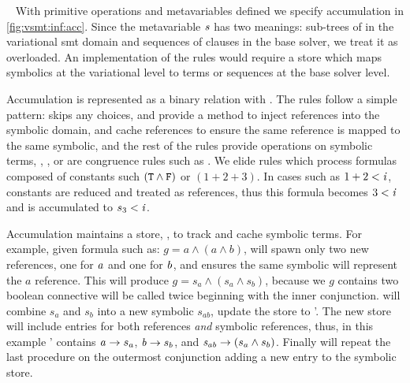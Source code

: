 ~\label{section:vsmt:accumulation}
%
With primitive operations and metavariables defined we specify accumulation in
\autoref{fig:vsmt:inf:acc}. Since the metavariable $\mathit{s}$ has two meanings:
sub-trees of  in the variational \ac{smt} domain and sequences of
clauses in the base solver, we treat it as overloaded.
%
%
An implementation of the rules would require a store which maps symbolics at
the variational level to terms or sequences at the base solver level.

Accumulation is represented as a binary relation with \accumulation{}. The rules
follow a simple pattern:  skips any choices,  and
 provide a method to inject references into the symbolic domain,
 and  cache references to ensure the same
reference is mapped to the same symbolic, and the rest of the rules provide
operations on symbolic terms, \eg{}, , or are congruence rules
such as . We elide rules which process formulas composed of
constants such $\mathit{(\texttt{T}{} \wedge \texttt{F}{})}$ or $(1 + 2 + 3)$. In cases such as
$1 + 2 < \mathit{i}$, constants are reduced and treated as references, thus this
formula becomes $3 < \mathit{i}$ and is accumulated to $s_{3} < \mathit{i}$.

Accumulation maintains a store, \aStore{}, to track and cache symbolic terms.
For example, given formula such as: $g = a \wedge (a \wedge b)$, 
will spawn only two new references, one for $\mathit{a}$ and one for $\mathit{b}$, and
 ensures the same symbolic will represent the $a$ reference. This
will produce $g = s_{a} \wedge (s_{a} \wedge s_{b})$, because we $g$ contains
two boolean connective  will be called twice beginning with the
inner conjunction.  will combine $s_{a}$ and $s_{b}$ into a new
symbolic $s_{ab}$, update the store to \aStore{}'. The new store will include
entries for both references \textit{and} symbolic references, thus, in this
example \aStore{}' contains $\mathit{a} \rightarrow s_{a}$, $\mathit{b} \rightarrow
s_{b}$, and $\mathit{s_{ab}} \rightarrow (s_{a} \wedge s_{b})$. Finally
 will repeat the last procedure on the outermost conjunction
adding a new entry to the symbolic store.

